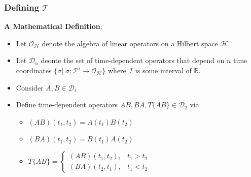 \documentclass{beamer}
\begin{document}
\begin{frame}
\frametitle{Defining $\mathscr{T}$}
\alert{\textbf{A Mathematical Definition}:}
\begin{itemize}
    \item[\textbullet]<2-> Let $\mathcal{O}_{\mathcal{H}}$ denote the algebra of linear operators on a Hilbert space $\mathcal{H}$.
    \item[\textbullet]<3-> Let $\mathcal{D}_n$ deonte the set of time-dependent operators that depend on $n$ time coordinates $\{\sigma|\;\sigma:\mathcal{I}^n\to\mathcal{O}_{\mathcal{H}}\}$ where $\mathcal{I}$ is some interval of $\mathbb{R}$.
    \item[\textbullet]<4-> Consider $A, B \in \mathcal{D}_1$
    \item[\textbullet]<5-> Define time-dependent operators $AB, BA, T\{AB\} \in \mathcal{D}_2$ via
    \begin{itemize}
        \item<6-> $(AB)(t_1, t_2) = A(t_1)B(t_2)$
        \vspace{0.1cm}
        \item<7-> $(BA)(t_1, t_2) = B(t_1)A(t_2)$
        \vspace{0.1cm}
        \item<8-> $T\{AB\} = \begin{cases}
			(AB)(t_1, t_2), & t_1 > t_2 \\
            (BA)(t_2, t_1), & t_1 < t_2
		 \end{cases}$
    \end{itemize} 
\end{itemize}
\end{frame}
\end{document}
